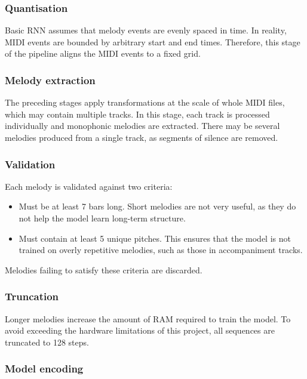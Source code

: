 \documentclass[../../report.tex]{subfiles}
\begin{document}
\subsubsection{Quantisation}

Basic RNN assumes that melody events are evenly spaced in time. In reality, MIDI
events are bounded by arbitrary start and end times. Therefore, this stage of
the pipeline aligns the MIDI events to a fixed grid.

\subsubsection{Melody extraction}

The preceding stages apply transformations at the scale of whole MIDI files,
which may contain multiple tracks. In this stage, each track is processed
individually and monophonic melodies are extracted. There may be several
melodies produced from a single track, as segments of silence are removed.

\subsubsection{Validation}

Each melody is validated against two criteria:

\begin{itemize}
  \item Must be at least 7 bars long. Short melodies are not very useful, as
  they do not help the model learn long-term structure.

  \item Must contain at least 5 unique pitches. This ensures that the model is
  not trained on overly repetitive melodies, such as those in accompaniment
  tracks.
\end{itemize}

Melodies failing to satisfy these criteria are discarded.

\subsubsection{Truncation}

Longer melodies increase the amount of RAM required to train the model. To avoid
exceeding the hardware limitations of this project, all sequences are truncated
to 128 steps.

\subsubsection{Model encoding}
\end{document}
